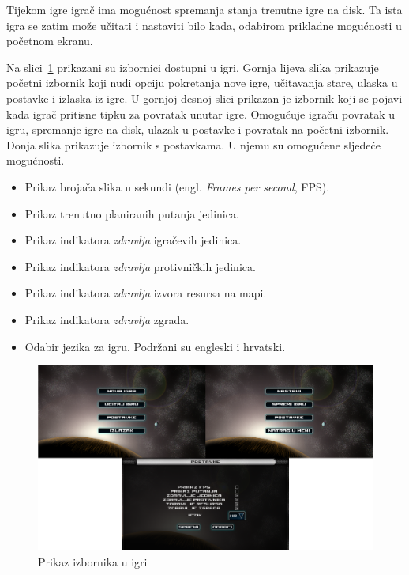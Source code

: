 \documentclass[times, utf8, zavrsni, numeric]{fer}
\begin{document}
\par Tijekom igre igrač ima mogućnost spremanja stanja trenutne igre na disk.
Ta ista igra se zatim može učitati i nastaviti bilo kada, odabirom prikladne mogućnosti u početnom ekranu.

\par Na slici~\ref{fig:menus} prikazani su izbornici dostupni u igri.
Gornja lijeva slika prikazuje početni izbornik koji nudi opciju pokretanja nove igre, učitavanja stare, ulaska u postavke i izlaska iz igre.
U gornjoj desnoj slici prikazan je izbornik koji se pojavi kada igrač pritisne tipku za povratak unutar igre.
Omogućuje igraču povratak u igru, spremanje igre na disk, ulazak u postavke i povratak na početni izbornik.
Donja slika prikazuje izbornik s postavkama.
U njemu su omogućene sljedeće mogućnosti.
\begin{itemize}
	\item Prikaz brojača slika u sekundi (engl. \textit{Frames per second}, FPS).
	\item Prikaz trenutno planiranih putanja jedinica.
	\item Prikaz indikatora \textit{zdravlja} igračevih jedinica.
	\item Prikaz indikatora \textit{zdravlja} protivničkih jedinica.
	\item Prikaz indikatora \textit{zdravlja} izvora resursa na mapi.
	\item Prikaz indikatora \textit{zdravlja} zgrada.
	\item Odabir jezika za igru. Podržani su engleski i hrvatski.
\end{itemize}

\begin{figure}[h]
	\centering
	\includegraphics[width=1.0\linewidth]{images/menus.png}
	\caption{Prikaz izbornika u igri}
	\label{fig:menus}
\end{figure}
\end{document}
